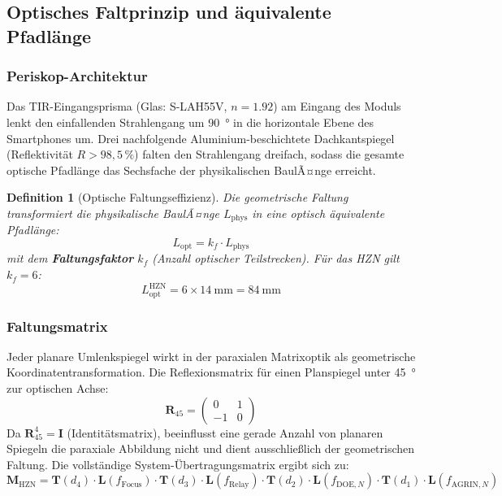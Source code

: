 ﻿\documentclass[12pt,a4paper]{article}
\newtheorem{definition}[theorem]{Definition}
\theoremstyle{definition}
\newcommand{\AGRIN}{\mathrm{AGRIN}}
\newcommand{\DOE}{\mathrm{DOE}}
\begin{document}
	\subsection{Optisches Faltprinzip und \"aquivalente Pfadl\"ange}

	\subsubsection{Periskop-Architektur}

	Das TIR-Eingangsprisma (Glas: S-LAH55V, $n = 1.92$) am Eingang des Moduls
	lenkt den einfallenden Strahlengang um \SI{90}{\degree} in die horizontale
	Ebene des Smartphones um. Drei nachfolgende Aluminium-beschichtete
	Dachkantspiegel (Reflektivit\"at $R > 98{,}5\,\%$) falten den Strahlengang
	dreifach, sodass die gesamte optische Pfadl\"ange das Sechsfache der
	physikalischen BaulÃ¤nge erreicht.

	\begin{definition}[Optische Faltungseffizienz]
		Die geometrische Faltung transformiert die physikalische BaulÃ¤nge
		$L_\mathrm{phys}$ in eine optisch \"aquivalente Pfadl\"ange:
		\begin{equation}
			L_\mathrm{opt} = k_f \cdot L_\mathrm{phys}
			\label{eq:fold_path}
		\end{equation}
		mit dem \textbf{Faltungsfaktor} $k_f$ (Anzahl optischer Teilstrecken).
		F\"ur das HZN gilt $k_f = 6$:
		\begin{equation}
			L_\mathrm{opt}^\mathrm{HZN}
			= 6 \times \SI{14}{\milli\metre} = \SI{84}{\milli\metre}
			\label{eq:fold_path_hzn}
		\end{equation}
	\end{definition}

	\subsubsection{Faltungsmatrix}

	Jeder planare Umlenkspiegel wirkt in der paraxialen Matrixoptik als
	geometrische Koordinatentransformation.  Die Reflexionsmatrix f\"ur einen
	Planspiegel unter \SI{45}{\degree} zur optischen Achse:
	\begin{equation}
		\mathbf{R}_{45} =
		\begin{pmatrix} 0 & 1 \\ -1 & 0 \end{pmatrix}
		\label{eq:fold_matrix}
	\end{equation}
	Da $\mathbf{R}_{45}^4 = \mathbf{I}$ (Identit\"atsmatrix), beeinflusst eine
	gerade Anzahl von planaren Spiegeln die paraxiale Abbildung nicht und
	dient ausschlie{\ss}lich der geometrischen Faltung. Die vollst\"andige
	System-\"Ubertragungsmatrix ergibt sich zu:
	\begin{equation}
		\mathbf{M}_\mathrm{HZN} =
		\mathbf{T}(d_4)\cdot\mathbf{L}(f_\mathrm{Focus})\cdot
		\mathbf{T}(d_3)\cdot\mathbf{L}(f_\mathrm{Relay})\cdot
		\mathbf{T}(d_2)\cdot\mathbf{L}(f_{\DOE,N})\cdot
		\mathbf{T}(d_1)\cdot\mathbf{L}(f_{\AGRIN,N})
		\label{eq:rtm_hzn}
	\end{equation}
\end{document}
